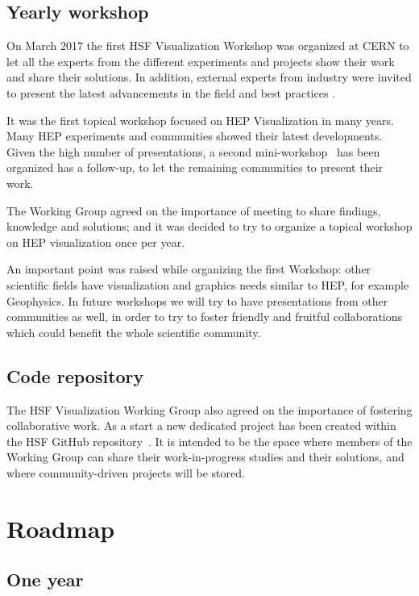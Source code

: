 \documentclass[12pt,a4paper]{article}
\begin{document}
\hypertarget{workshop}{%
\subsection{Yearly workshop}\label{workshop}}

On March 2017 the first HSF Visualization Workshop was organized at CERN to let all the experts from the different experiments and projects
show their work and share their solutions. In addition, external experts from industry were invited to present the latest
advancements in the field and best practices \cite{HSFViz2017}.

It was the first topical workshop focused on HEP Visualization in many years. Many HEP
experiments and communities showed their latest developments. Given the high number of presentations, a second mini-workshop~\cite{HSFViz2017Mini} has been organized has a follow-up, to let the remaining communities to present their work.

The Working Group agreed on the importance of meeting to share findings, knowledge and solutions; and it was decided to
try to organize a topical workshop on HEP visualization once per year.

An important point was raised while organizing the first Workshop: other scientific fields have visualization and
graphics needs similar to HEP, for example Geophysics. In future workshops we will try to
have presentations from other communities as well, in order to try to foster friendly and fruitful collaborations
which could benefit the whole scientific community.

\hypertarget{repo}{%
\subsection{Code repository}\label{repo}}

The HSF Visualization Working Group also agreed on the importance of fostering collaborative work.
As a start a new dedicated project has been created within the HSF GitHub repository~\cite{HSFVizRepo}.
It is intended to be the space where members of the Working Group can share their work-in-progress studies and their solutions, and where
community-driven projects will be stored.

\hypertarget{roadmap}{%
\section{Roadmap}\label{roadmap}}

\hypertarget{one-year}{%
\subsection{One year}\label{one-year}}
\end{document}
